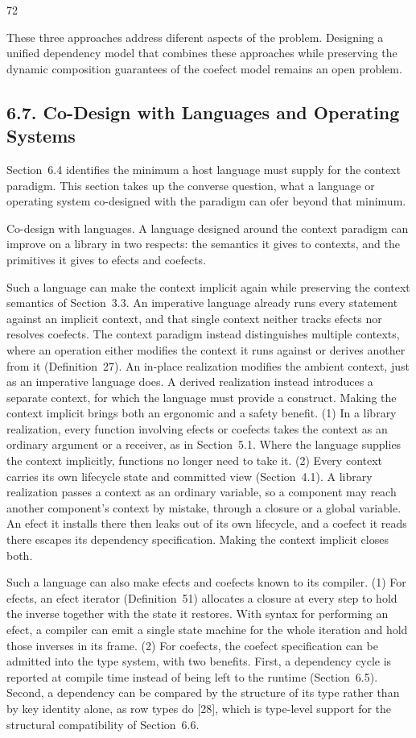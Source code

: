 \documentclass[
  10
]{article}
\begin{document}
72

These three approaches address diferent aspects of the problem.
Designing a unified dependency model that combines these approaches
while preserving the dynamic composition guarantees of the coefect model
remains an open problem.

\subsection{6.7. Co-Design with Languages and Operating
Systems}\label{co-design-with-languages-and-operating-systems}

Section~6.4 identifies the minimum a host language must supply for the
context paradigm. This section takes up the converse question, what a
language or operating system co-designed with the paradigm can ofer
beyond that minimum.

Co-design with languages. A language designed around the context
paradigm can improve on a library in two respects: the semantics it
gives to contexts, and the primitives it gives to efects and coefects.

Such a language can make the context implicit again while preserving the
context semantics of Section~3.3. An imperative language already runs
every statement against an implicit context, and that single context
neither tracks efects nor resolves coefects. The context paradigm
instead distinguishes multiple contexts, where an operation either
modifies the context it runs against or derives another from it
(Definition~27). An in-place realization modifies the ambient context,
just as an imperative language does. A derived realization instead
introduces a separate context, for which the language must provide a
construct. Making the context implicit brings both an ergonomic and a
safety benefit. (1) In a library realization, every function involving
efects or coefects takes the context as an ordinary argument or a
receiver, as in Section~5.1. Where the language supplies the context
implicitly, functions no longer need to take it. (2) Every context
carries its own lifecycle state and committed view (Section~4.1). A
library realization passes a context as an ordinary variable, so a
component may reach another component's context by mistake, through a
closure or a global variable. An efect it installs there then leaks out
of its own lifecycle, and a coefect it reads there escapes its
dependency specification. Making the context implicit closes both.

Such a language can also make efects and coefects known to its compiler.
(1) For efects, an efect iterator (Definition~51) allocates a closure at
every step to hold the inverse together with the state it restores. With
syntax for performing an efect, a compiler can emit a single state
machine for the whole iteration and hold those inverses in its frame.
(2) For coefects, the coefect specification can be admitted into the
type system, with two benefits. First, a dependency cycle is reported at
compile time instead of being left to the runtime (Section~6.5). Second,
a dependency can be compared by the structure of its type rather than by
key identity alone, as row types do {[}28{]}, which is type-level
support for the structural compatibility of Section~6.6.
\end{document}
